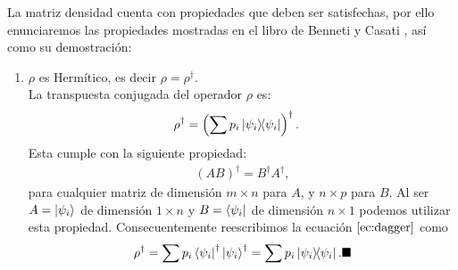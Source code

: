 \documentclass[letterpaper,12pt]{thesisECFM}
\theoremstyle{plain}
\theoremstyle{definition}
\theoremstyle{definition}
\theoremstyle{remark}
\newcommand{\1}{\mathbb{1}}
\begin{document}
La matriz densidad cuenta con propiedades que deben ser satisfechas, por ello
enunciaremos las propiedades mostradas en el libro de  Benneti y Casati
\cite{princip_quantum}, así como su demostración:
\begin{enumerate}
\item $\rho$ es Hermítico, es decir $\rho = \rho^{\dagger}.$\\ 
La transpuesta conjugada del operador $\rho$ es:
\begin{align}
    \label{ec:dagger}
    \rho^{\dagger}  & = \left(\sum p_i \ketbra{\psi_i}  \right)^{\dagger}.
\end{align}
Esta cumple con la siguiente propiedad:
\begin{align}
    (AB)^{\dagger} = B^{\dagger} A^{\dagger},
\end{align}
para cualquier matriz de dimensión $m\times n $ para $A$,  y $n \times p$ para
$B$. Al ser $A = \ket{\psi_i}$ de dimensión $1\times n$ y $B = \bra{\psi_i}$ de
dimensión $n \times 1$ podemos utilizar esta propiedad. Consecuentemente
reescribimos la ecuación $\ref{ec:dagger}$ como
\begin{align}
    \rho^{\dagger} = \sum p_i  \bra{\psi_i}^{\dagger} \ket{\psi_i}^{\dagger} = \sum p_i \ketbra{\psi_i}.  \blacksquare
\end{align}


\end{enumerate}
\end{document}
